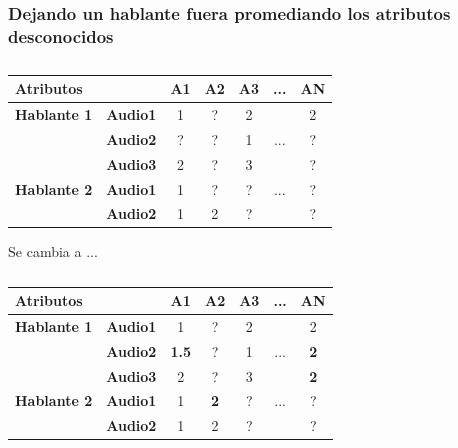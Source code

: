 \documentclass[mathserif]{beamer}%
\begin{document}
\begin{frame}
	\frametitle{Dejando un hablante fuera promediando los atributos desconocidos}
	
	\begin{table}[H]
		\centering
		\resizebox{7cm}{!} {
		\begin{tabular}{|l|l|ccccc|}
			\hline
			\multicolumn{2}{|l|}{Atributos} & A1 & A2 & A3 & ... & AN \\
			\hline 
			\textbf{Hablante 1} & \textbf{Audio1} & 1 & ? & 2 & & 2\\
			& \textbf{Audio2} & ? & ? & 1 & ... & ? \\
			& \textbf{Audio3} & 2 & ? & 3 & & ? \\
			\hline
			\textbf{Hablante 2} & \textbf{Audio1} & 1 & ? & ? & ... & ? \\
			& \textbf{Audio2} & 1 & 2 & ? & & ? \\
			\hline
			\end{tabular}
		}
		\caption{}
		\label{}
		\end{table}
		
			
		Se cambia a ...
		
		\begin{table}[H]
			\centering
			\resizebox{7cm}{!} {
			\begin{tabular}{|l|l|ccccc|}
				\hline
				\multicolumn{2}{|l|}{Atributos} & A1 & A2 & A3 & ... & AN \\
				\hline 
				\textbf{Hablante 1} & \textbf{Audio1} & 1 & ? & 2 & & 2\\
				& \textbf{Audio2} & \textbf{1.5} & ? & 1 & ... & \textbf{2} \\
				& \textbf{Audio3} & 2 & ? & 3 & & \textbf{2} \\
				\hline
				\textbf{Hablante 2} & \textbf{Audio1} & 1 & \textbf{2} & ? & ... & ? \\
				& \textbf{Audio2} & 1 & 2 & ? & & ? \\
				\hline
			\end{tabular}
			}
			\caption{}
			\label{}
		\end{table}
\end{frame}
	
\end{document}
